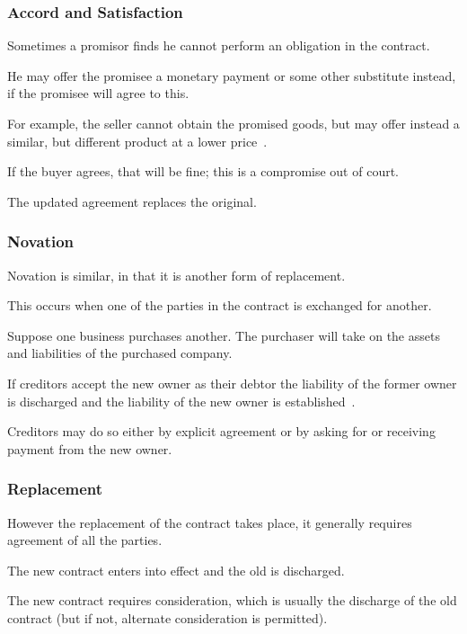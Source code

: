 \begin{frame}
\frametitle{Accord and Satisfaction}

Sometimes a promisor finds he cannot perform an obligation in the contract.

He may offer the promisee a monetary payment or some other substitute instead, if the promisee will agree to this.

For example, the seller cannot obtain the promised goods, but may offer instead a similar, but different product at a lower price~\cite{lba}.

If the buyer agrees, that will be fine; this is a compromise out of court.

The updated agreement replaces the original.

\end{frame}

\begin{frame}
\frametitle{Novation}

Novation is similar, in that it is another form of replacement.

This occurs when one of the parties in the contract is exchanged for another.

Suppose one business purchases another. The purchaser will take on the assets and liabilities of the purchased company.

If creditors accept the new owner as their debtor the liability of the former owner is discharged and the liability of the new owner is established~\cite{lba}.

Creditors may do so either by explicit agreement or by asking for or receiving payment from the new owner.

\end{frame}



\begin{frame}
\frametitle{Replacement}

However the replacement of the contract takes place, it generally requires agreement of all the parties.

The new contract enters into effect and the old is discharged.

The new contract requires consideration, which is usually the discharge of the old contract (but if not, alternate consideration is permitted).

\end{frame}



